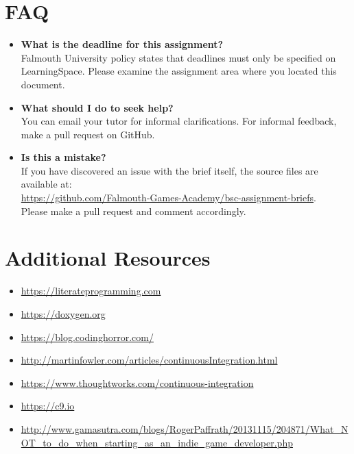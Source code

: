 \documentclass{../fal_assignment}
\begin{document}
\section*{FAQ}

\begin{itemize}
	\item 	\textbf{What is the deadline for this assignment?} \\ 
    		Falmouth University policy states that deadlines must only be specified on LearningSpace. Please examine the assignment area where you located this document.
    		
	\item 	\textbf{What should I do to seek help?} \\ 
    		You can email your tutor for informal clarifications. For informal feedback, make a pull request on GitHub. 
    		
    	\item 	\textbf{Is this a mistake?} \\ 	
    		If you have discovered an issue with the brief itself, the source files are available at: \\
    		\url{https://github.com/Falmouth-Games-Academy/bsc-assignment-briefs}.\\
    		 Please make a pull request and comment accordingly.
\end{itemize}

\section*{Additional Resources}

\begin{itemize}
    \item \url{https://literateprogramming.com}
    \item \url{https://doxygen.org}
    \item \url{https://blog.codinghorror.com/}
    \item \url{http://martinfowler.com/articles/continuousIntegration.html}
    \item \url{https://www.thoughtworks.com/continuous-integration}
    \item \url{https://c9.io}
    \item \url{http://www.gamasutra.com/blogs/RogerPaffrath/20131115/204871/What_NOT_to_do_when_starting_as_an_indie_game_developer.php}
\end{itemize}

\rubricyeartwo
\end{document}
